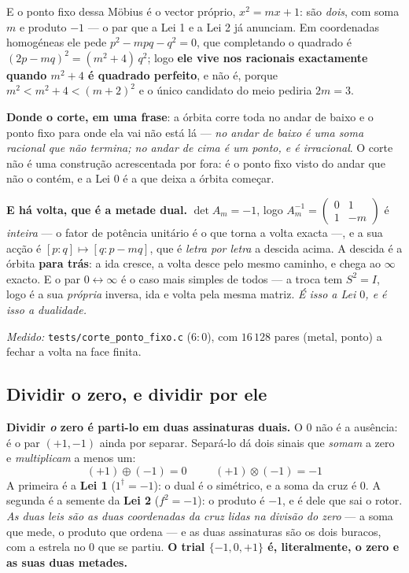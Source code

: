 \documentclass[11pt,a4paper]{article}
\newcommand{\code}[1]{\texttt{\small #1}}
\newcommand{\dg}{^{\dagger}}
\begin{document}
\noindent E o ponto fixo dessa Möbius é o vector próprio, $x^{2}=mx+1$: são \emph{dois},
com soma $m$ e produto $-1$ --- o par que a Lei 1 e a Lei 2 já anunciam. Em coordenadas
homogéneas ele pede $p^{2}-mpq-q^{2}=0$, que completando o quadrado é
$(2p-mq)^{2}=(m^{2}+4)\,q^{2}$; logo \textbf{ele vive nos racionais exactamente quando
$m^{2}+4$ é quadrado perfeito}, e não é, porque $m^{2}<m^{2}+4<(m+2)^{2}$ e o único
candidato do meio pediria $2m=3$.

\noindent \textbf{Donde o corte, em uma frase}: a órbita corre toda no andar de baixo e o
ponto fixo para onde ela vai não está lá --- \emph{no andar de baixo é uma soma racional
que não termina; no andar de cima é um ponto, e é irracional}. O corte não é uma
construção acrescentada por fora: é o ponto fixo visto do andar que não o contém, e a Lei
$0$ é a que deixa a órbita começar.

\noindent \textbf{E há volta, que é a metade dual.} $\det A_m=-1$, logo
$A_m^{-1}=\left(\begin{smallmatrix}0&1\\1&-m\end{smallmatrix}\right)$ é \emph{inteira} ---
o fator de potência unitário é o que torna a volta exacta ---, e a sua acção é
$[p:q]\mapsto[q:p-mq]$, que é \emph{letra por letra} a descida acima. A descida é a órbita
\textbf{para trás}: a ida cresce, a volta desce pelo mesmo caminho, e chega ao $\infty$
exacto. E o par $0\leftrightarrow\infty$ é o caso mais simples de todos --- a troca tem
$S^{2}=I$, logo é a sua \emph{própria} inversa, ida e volta pela mesma matriz. \emph{É isso
a Lei $0$, e é isso a dualidade.}

\emph{Medido:} \code{tests/corte\_ponto\_fixo.c} ($6{:}0$), com $16\,128$ pares
(metal, ponto) a fechar a volta na face finita.

\subsection*{Dividir o zero, e dividir por ele}

\textbf{Dividir \emph{o} zero é parti-lo em duas assinaturas duais.} O $0$ não é a ausência: é o par
$(+1,-1)$ ainda por separar. Separá-lo dá dois sinais que \emph{somam} a zero e \emph{multiplicam} a
menos um:
\[
  \boxed{\;(+1)\oplus(-1)=0\;}\qquad\boxed{\;(+1)\otimes(-1)=-1\;}
\]
A primeira é a \textbf{Lei 1} ($1\dg=-1$): o dual é o simétrico, e a soma da cruz é $0$. A segunda é a
semente da \textbf{Lei 2} ($f^2=-1$): o produto é $-1$, e é dele que sai o rotor. \emph{As duas leis são
as duas coordenadas da cruz lidas na divisão do zero} --- a soma que mede, o produto que ordena --- e as
duas assinaturas são os dois buracos, com a estrela no $0$ que se partiu. \textbf{O trial
$\{-1,0,+1\}$ é, literalmente, o zero e as suas duas metades.}
\end{document}
